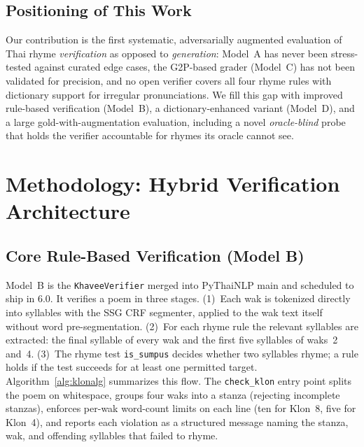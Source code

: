 \documentclass[conference]{IEEEtran}
\begin{document}
\subsection{Positioning of This Work}

Our contribution is the first systematic,
adversarially augmented evaluation of Thai rhyme \emph{verification} as
opposed to \emph{generation}: Model~A has never been stress-tested against
curated edge cases, the G2P-based grader (Model~C) has not been validated
for precision, and no open verifier covers all four rhyme rules with
dictionary support for irregular pronunciations. We fill this gap with
improved rule-based verification (Model~B), a dictionary-enhanced variant
(Model~D), and a large gold-with-augmentation evaluation, including a
novel \emph{oracle-blind} probe that holds the verifier accountable
for rhymes its oracle cannot see.


\section{Methodology: Hybrid Verification Architecture}

\subsection{Core Rule-Based Verification (Model B)}

Model~B is the \texttt{KhaveeVerifier} merged into PyThaiNLP main and scheduled to ship in 6.0.
It verifies a poem in three stages. (1)~Each wak is tokenized directly into syllables
with the SSG CRF segmenter, applied to the wak text itself without word
pre-segmentation. (2)~For each rhyme rule the relevant syllables are
extracted: the final syllable of every wak and the first five syllables of
waks~2 and~4. (3)~The rhyme test \texttt{is\_sumpus} decides whether two
syllables rhyme; a rule holds if the test succeeds for at least one
permitted target. Algorithm~\ref{alg:klonalg} summarizes this flow.
The \texttt{check\_klon}
entry point splits the poem on whitespace, groups four waks into a
stanza (rejecting incomplete stanzas), enforces per-wak word-count limits
on each line (ten for Klon~8, five for Klon~4), and reports
each violation as a structured message naming the stanza, wak, and
offending syllables that failed to rhyme.
\end{document}
